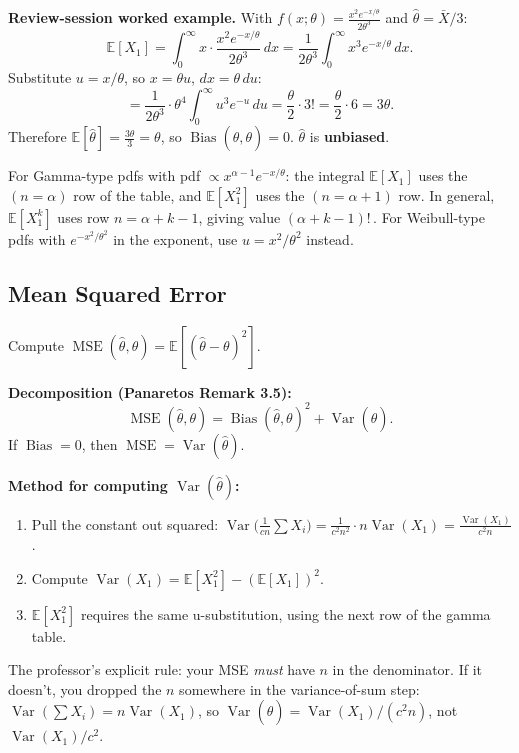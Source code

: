 \documentclass[11pt,a4paper]{article}
\newcommand{\E}{\mathbb{E}}
\newcommand{\Var}{\operatorname{Var}}
\newcommand{\Bias}{\operatorname{Bias}}
\newcommand{\MSE}{\operatorname{MSE}}
\begin{document}
\textbf{Review-session worked example.} With $f(x;\theta)=\frac{x^2 e^{-x/\theta}}{2\theta^3}$ and $\hat\theta = \bar X/3$:
\[
  \E[X_1] = \int_0^\infty x \cdot \frac{x^2 e^{-x/\theta}}{2\theta^3}\,dx
  = \frac{1}{2\theta^3}\int_0^\infty x^3 e^{-x/\theta}\,dx.
\]
Substitute $u = x/\theta$, so $x = \theta u$, $dx = \theta\,du$:
\[
  = \frac{1}{2\theta^3} \cdot \theta^4 \int_0^\infty u^3 e^{-u}\,du
  = \frac{\theta}{2} \cdot 3! = \frac{\theta}{2}\cdot 6 = 3\theta.
\]
Therefore $\E[\hat\theta] = \frac{3\theta}{3} = \theta$, so $\Bias(\hat\theta,\theta) = 0$. $\hat\theta$ is \textbf{unbiased}.

\begin{tcolorbox}[infobox, title={The gamma integral pattern}]
For Gamma-type pdfs with pdf $\propto x^{\alpha-1}e^{-x/\theta}$: the integral $\E[X_1]$ uses the $(n=\alpha)$ row of the table, and $\E[X_1^2]$ uses the $(n=\alpha+1)$ row. In general, $\E[X_1^k]$ uses row $n = \alpha+k-1$, giving value $(\alpha+k-1)!\,$. For Weibull-type pdfs with $e^{-x^2/\theta^2}$ in the exponent, use $u = x^2/\theta^2$ instead.
\end{tcolorbox}

\subsection{Mean Squared Error}

\begin{tcolorbox}[questionbox, title={Question 4}]
Compute $\MSE(\hat\theta,\theta) = \E[(\hat\theta-\theta)^2]$.
\end{tcolorbox}

\textbf{Decomposition (Panaretos Remark 3.5):}
\[
  \MSE(\hat\theta,\theta) = \Bias(\hat\theta,\theta)^2 + \Var(\hat\theta).
\]
If $\Bias = 0$, then $\MSE = \Var(\hat\theta)$.

\textbf{Method for computing $\Var(\hat\theta)$:}
\begin{enumerate}[leftmargin=2em]
  \item Pull the constant out squared: $\Var\!\bigl(\tfrac{1}{cn}\sum X_i\bigr) = \frac{1}{c^2 n^2}\cdot n\Var(X_1) = \frac{\Var(X_1)}{c^2 n}$.
  \item Compute $\Var(X_1) = \E[X_1^2] - (\E[X_1])^2$.
  \item $\E[X_1^2]$ requires the same u-substitution, using the next row of the gamma table.
\end{enumerate}

\begin{tcolorbox}[warnbox, title={The $n$ in the denominator check}]
The professor's explicit rule: your MSE \emph{must} have $n$ in the denominator. If it doesn't, you dropped the $n$ somewhere in the variance-of-sum step: $\Var(\sum X_i) = n\Var(X_1)$, so $\Var(\hat\theta) = \Var(X_1)/(c^2 n)$, not $\Var(X_1)/c^2$.
\end{tcolorbox}
\end{document}
